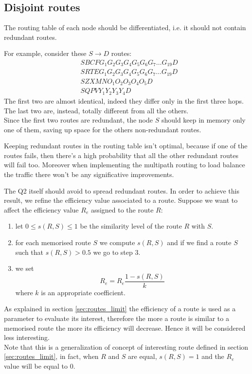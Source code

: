 \documentclass[a4paper]{article}
\begin{document}
\subsection{Disjoint routes}
The routing table of each node should be differentiated, i.e. it should not
contain redundant routes.

For example, consider these $S \rightarrow D$ routes:
\begin{align}
	& SBCFG_1G_2G_3G_4G_5G_6G_7 \dots G_{19} D	\\
	& SRTEG_1G_2G_3G_4G_5G_6G_7 \dots G_{19} D	\\
	& SZXMNO_1O_2O_3O_4O_5D				\\
	& SQPVY_1Y_2Y_3Y_4D
\end{align}
The first two are almost identical, indeed they differ only in the first three
hops. The last two are, instead, totally different from all the others.\\
Since the first two routes are redundant, the node $S$ should keep in memory only
one of them, saving up space for the others non-redundant routes.
\newline

Keeping redundant routes in the routing table isn't optimal, because if one of the
routes fails, then there's a high probability that all the other redundant
routes will fail too. Moreover when implementing the multipath routing to load
balance the traffic there won't be any significative improvements.
\newline

The Q2 itself should avoid to spread redundant routes. In order to achieve
this result, we refine the efficiency value associated to a route. Suppose we
want to affect the efficiency value $R_e$ assigned to the route $R$:
\begin{enumerate}
	\item let $0\le s(R,S)\le 1$ be the similarity level of the route $R$
		with $S$.
	\item for each memorised route $S$ we compute $s(R,S)$ and if we find
		a route $S$ such that $s(R,S) > 0.5$ we go to step 3.
	\item we set \[R_e = R_e\frac{1-s(R,S)}{k}\] where $k$ is an appropriate
		coefficient.
\end{enumerate}
As explained in section \ref{sec:routes_limit} the efficiency of a route is
used as a parameter to evaluate its interest, therefore the more a route is
similar to a memorised route the more its efficiency will decrease. Hence it
will be considered less interesting.\\
Note that this is a generalization of concept of interesting route defined in
section \ref{sec:routes_limit}, in fact, when $R$ and $S$ are equal,
$s(R,S)=1$ and the $R_e$ value will be equal to $0$.
\end{document}
